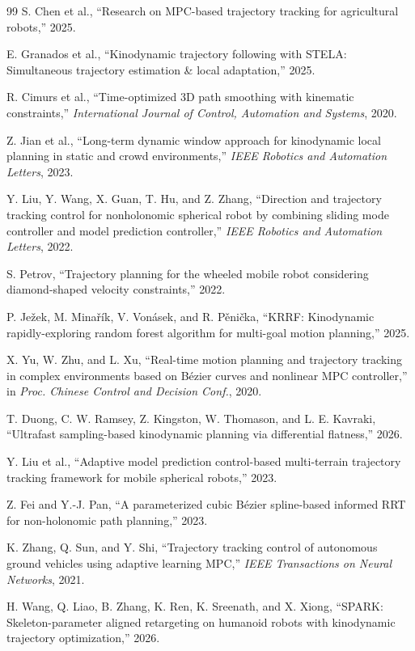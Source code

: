 \begin{thebibliography}{99}
S. Chen et al., ``Research on MPC-based trajectory tracking for agricultural robots,'' 2025.

E. Granados et al., ``Kinodynamic trajectory following with STELA: Simultaneous trajectory estimation \& local adaptation,'' 2025.

R. Cimurs et al., ``Time-optimized 3D path smoothing with kinematic constraints,'' \emph{International Journal of Control, Automation and Systems}, 2020.

Z. Jian et al., ``Long-term dynamic window approach for kinodynamic local planning in static and crowd environments,'' \emph{IEEE Robotics and Automation Letters}, 2023.

Y. Liu, Y. Wang, X. Guan, T. Hu, and Z. Zhang, ``Direction and trajectory tracking control for nonholonomic spherical robot by combining sliding mode controller and model prediction controller,'' \emph{IEEE Robotics and Automation Letters}, 2022.

S. Petrov, ``Trajectory planning for the wheeled mobile robot considering diamond-shaped velocity constraints,'' 2022.

P. Ježek, M. Minařík, V. Vonásek, and R. Pěnička, ``KRRF: Kinodynamic rapidly-exploring random forest algorithm for multi-goal motion planning,'' 2025.

X. Yu, W. Zhu, and L. Xu, ``Real-time motion planning and trajectory tracking in complex environments based on Bézier curves and nonlinear MPC controller,'' in \emph{Proc. Chinese Control and Decision Conf.}, 2020.

T. Duong, C. W. Ramsey, Z. Kingston, W. Thomason, and L. E. Kavraki, ``Ultrafast sampling-based kinodynamic planning via differential flatness,'' 2026.

Y. Liu et al., ``Adaptive model prediction control-based multi-terrain trajectory tracking framework for mobile spherical robots,'' 2023.

Z. Fei and Y.-J. Pan, ``A parameterized cubic Bézier spline-based informed RRT for non-holonomic path planning,'' 2023.

K. Zhang, Q. Sun, and Y. Shi, ``Trajectory tracking control of autonomous ground vehicles using adaptive learning MPC,'' \emph{IEEE Transactions on Neural Networks}, 2021.

H. Wang, Q. Liao, B. Zhang, K. Ren, K. Sreenath, and X. Xiong, ``SPARK: Skeleton-parameter aligned retargeting on humanoid robots with kinodynamic trajectory optimization,'' 2026.


\end{thebibliography}
